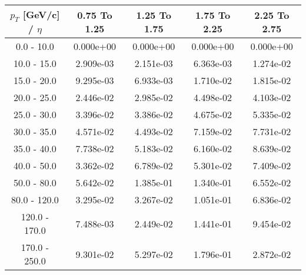 \begin{tabular}{|c|c|c|c|c|}\hline 
$p_T$ [GeV/c] / $\eta$  & 0.75 To 1.25 & 1.25 To 1.75 & 1.75 To 2.25 & 2.25 To 2.75 \\ 
 \hline 
0.0 - 10.0 & 0.000e+00 & 0.000e+00 & 0.000e+00 & 0.000e+00 \\ 
10.0 - 15.0 & 2.909e-03 & 2.151e-03 & 6.363e-03 & 1.274e-02 \\ 
15.0 - 20.0 & 9.295e-03 & 6.933e-03 & 1.710e-02 & 1.815e-02 \\ 
20.0 - 25.0 & 2.446e-02 & 2.985e-02 & 4.498e-02 & 4.103e-02 \\ 
25.0 - 30.0 & 3.396e-02 & 3.386e-02 & 4.675e-02 & 5.335e-02 \\ 
30.0 - 35.0 & 4.571e-02 & 4.493e-02 & 7.159e-02 & 7.731e-02 \\ 
35.0 - 40.0 & 7.738e-02 & 5.183e-02 & 6.160e-02 & 8.639e-02 \\ 
40.0 - 50.0 & 3.362e-02 & 6.789e-02 & 5.301e-02 & 7.409e-02 \\ 
50.0 - 80.0 & 5.642e-02 & 1.385e-01 & 1.340e-01 & 6.552e-02 \\ 
80.0 - 120.0 & 3.295e-02 & 3.267e-02 & 1.051e-01 & 6.836e-02 \\ 
120.0 - 170.0 & 7.488e-03 & 2.449e-02 & 1.441e-01 & 9.454e-02 \\ 
170.0 - 250.0 & 9.301e-02 & 5.297e-02 & 1.796e-01 & 2.872e-02 \\ 
 \hline 
\end{tabular} 
